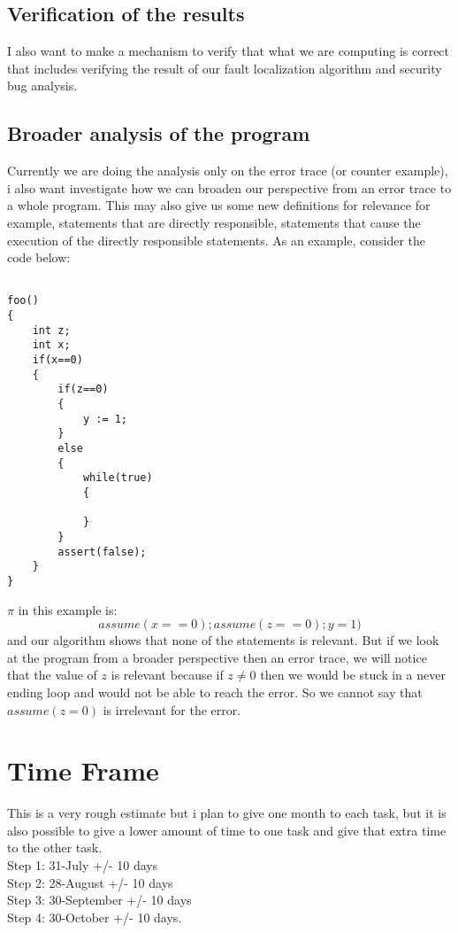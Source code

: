 \documentclass{article}
\begin{document}
\subsection{Verification of the results}
I also want to make a mechanism to verify that what we are computing is correct that includes verifying the result of our fault localization algorithm and security bug analysis.
\subsection{Broader analysis of the program}
Currently we are doing the analysis only on the error trace (or counter example), i also want investigate how we can broaden our perspective from an error trace to a whole program. This may also give us some new definitions for relevance for example, statements that are directly responsible, statements that cause the execution of the directly responsible statements. As an example, consider the code below:\\
\begin{lstlisting}

foo()
{
	int z;
	int x;
	if(x==0)
	{
		if(z==0)
		{
			y := 1;
		}
		else
		{
			while(true)
			{
				
			}
		}		
		assert(false);
	}	
}

\end{lstlisting}
$\pi$ in this example is:
$$ assume(x==0); assume(z==0); y=1) $$
and our algorithm shows that none of the statements is relevant. But if we look at the program from a broader perspective then an error trace, we will notice that the value of  $z$ is relevant because if $z \neq 0$ then we would be stuck in a never ending loop and would not be able to reach the error.  
So we cannot say that $assume(z=0)$ is irrelevant for the error.
\section{Time Frame}
This is a very rough estimate but i plan to give one month to each task, but it is also possible to give a lower amount of time to one task and give that extra time to the other task.\\
Step 1:  31-July +/- 10 days\\
Step 2: 28-August +/- 10 days\\
Step 3: 30-September +/- 10 days\\
Step 4: 30-October +/- 10 days.
\end{document}
